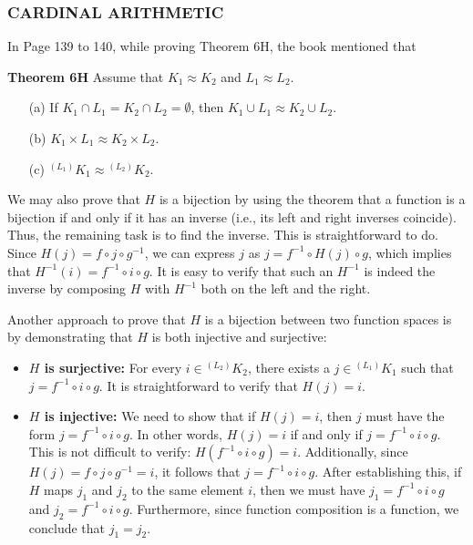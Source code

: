 \subsubsection{CARDINAL ARITHMETIC}

In Page 139 to 140, while proving Theorem 6H, the book mentioned that
\begin{leftbar}
    \textbf{Theorem 6H} Assume that $K_1 \approx K_2$ and $L_1 \approx L_2$.

    \begin{enumerate}
        \item[(a)] If $K_1 \cap L_1 = K_2 \cap L_2 = \emptyset$, then $K_1 \cup L_1 \approx K_2 \cup L_2$.
        \item[(b)] $K_1 \times L_1 \approx K_2 \times L_2$.
        \item[(c)] ${}^{(L_1)}K_1 \approx {}^{(L_2)}K_2$.
    \end{enumerate}

\end{leftbar}

We may also prove that \(H\) is a bijection by using the theorem that a function is a bijection if and only if it has an inverse (i.e., its left and right inverses coincide). Thus, the remaining task is to find the inverse. This is straightforward to do. Since \(H(j) = f \circ j \circ g^{-1}\), we can express \(j\) as \(j = f^{-1} \circ H(j) \circ g\), which implies that \(H^{-1}(i) = f^{-1} \circ i \circ g\). It is easy to verify that such an \(H^{-1}\) is indeed the inverse by composing \(H\) with \(H^{-1}\) both on the left and the right.

Another approach to prove that \(H\) is a bijection between two function spaces is by demonstrating that \(H\) is both injective and surjective:
\begin{itemize}
    \item \textbf{\(H\) is surjective:} For every \(i \in {}^{(L_2)}K_2\), there exists a \(j \in {}^{(L_1)}K_1\) such that \(j = f^{-1} \circ i \circ g\). It is straightforward to verify that \(H(j) = i\).
    \item \textbf{\(H\) is injective:} We need to show that if \(H(j) = i\), then \(j\) must have the form \(j = f^{-1} \circ i \circ g\). In other words, \(H(j) = i\) if and only if \(j = f^{-1} \circ i \circ g\). This is not difficult to verify: \(H(f^{-1} \circ i \circ g) = i\). Additionally, since \(H(j) = f \circ j \circ g^{-1} = i\), it follows that \(j = f^{-1} \circ i \circ g\). After establishing this, if \(H\) maps \(j_1\) and \(j_2\) to the same element \(i\), then we must have \(j_1 = f^{-1} \circ i \circ g\) and \(j_2 = f^{-1} \circ i \circ g\). Furthermore, since function composition is a function, we conclude that \(j_1 = j_2\).
\end{itemize}

